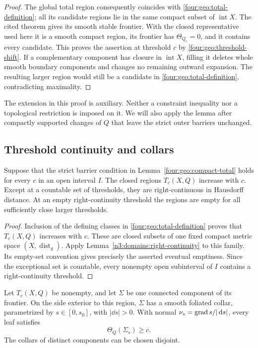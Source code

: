 \begin{proof}
The global total region consequently coincides with
\eqref{four:geo:total-definition}; all its candidate regions lie in the same
compact subset of $\operatorname{int}X$.  The cited theorem gives its smooth
stable frontier.  With the closed representative used here it is a smooth
compact region, its frontier has $\Theta_{Q_c}=0$, and it contains every
candidate.  This proves the assertion at threshold $c$ by
\eqref{four:geo:threshold-shift}.  If a complementary component has closure in
$\operatorname{int}X$, filling it deletes whole smooth boundary components
and changes no remaining outward expansion.  The resulting larger region
would still be a candidate in \eqref{four:geo:total-definition}, contradicting
maximality.
\end{proof}

The extension in this proof is auxiliary.  Neither a constraint inequality
nor a topological restriction is imposed on it.  We will also apply the
lemma after compactly supported changes of $Q$ that leave the strict outer
barriers unchanged.

\subsection{Threshold continuity and collars}

\begin{lemma}\label{four:geo:threshold-continuity}
Suppose that the strict barrier condition in Lemma~\ref{four:geo:compact-total}
holds for every $c$ in an open interval $I$.  The closed regions $T_c(X,Q)$
increase with $c$.  Except at a countable set of thresholds, they are
right-continuous in Hausdorff distance.  At an empty right-continuity
threshold the regions are empty for all sufficiently close larger
thresholds.
\end{lemma}

\begin{proof}
Inclusion of the defining classes in \eqref{four:geo:total-definition}
proves that $T_c(X,Q)$ increases with $c$.  These are closed subsets of
one fixed compact metric space $(X,\operatorname{dist}_g)$.  Apply
Lemma~\ref{n3:domains:right-continuity} to this family.  Its empty-set
convention gives precisely the asserted eventual emptiness.  Since the
exceptional set is countable, every nonempty open subinterval of $I$
contains a right-continuity threshold.
\end{proof}

\begin{lemma}\label{four:geo:stable-collar}
Let $T_c(X,Q)$ be nonempty, and let $\Sigma$ be one connected component of
its frontier.  On the side exterior to this region, $\Sigma$ has a smooth
foliated collar, parametrized by $s\in[0,s_0]$, with $|\dd s|>0$.  With
normal $\nu_s=\operatorname{grad} s/|\,\mathrm d s|$, every leaf satisfies
\begin{equation}\label{four:geo:collar-expansion}
 \Theta_Q(\Sigma_s)\ge c.
\end{equation}
The collars of distinct components can be chosen disjoint.
\end{lemma}

